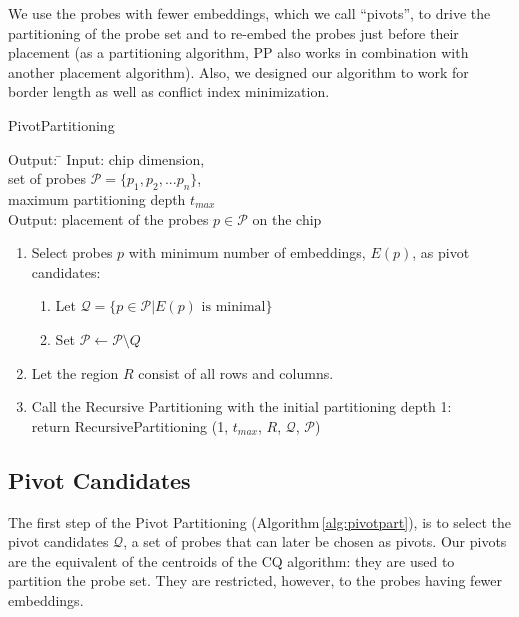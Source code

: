 \documentclass{llncs}
\begin{document}
We use the probes with fewer embeddings, which we call ``pivots'', to drive
the partitioning of the probe set and to re-embed the probes just before their
placement (as a partitioning algorithm, PP also works in combination with
another placement algorithm). Also, we designed our algorithm to work for
border length as well as conflict index minimization.

\begin{algorithm}
\caption{PivotPartitioning}
\label{alg:pivotpart}
\begin{minipage}{4.8in}

\begin{tabbing}
Output: \=                                  \kill
Input:  \> chip dimension,                          \\
        \> set of probes $\mathcal{P} = \{p_{1}, p_{2}, ... p_{n}\}$,       \\
        \> maximum partitioning depth $t_{max}$                 \\
Output: \> placement of the probes $p \in \mathcal{P}$ on the chip
\end{tabbing}

\begin{enumerate}
\item Select probes $p$ with minimum number of embeddings, $E(p)$,
as pivot candidates:
  \begin{enumerate}
  \item Let $\mathcal{Q} = \{p \in \mathcal{P} | E(p) \mbox{ is minimal}\}$
  \item Set $\mathcal{P} \leftarrow \mathcal{P} \setminus Q$
  \end{enumerate}
\item Let the region $R$ consist of all rows and columns.
\item Call the Recursive Partitioning with the initial partitioning depth 1:\\
  return RecursivePartitioning (1, $t_{max}$, $R$, $\mathcal{Q}$, $\mathcal{P}$)
\end{enumerate}
\end{minipage}
\end{algorithm}

\subsection{Pivot Candidates}

The first step of the Pivot Partitioning (Algorithm\,\ref{alg:pivotpart}), is
to select the pivot candidates $\mathcal{Q}$, a set of probes that can later
be chosen as pivots. Our pivots are the equivalent of the centroids of the CQ
algorithm: they are used to partition the probe set. They are restricted,
however, to the probes having fewer embeddings.
\end{document}
